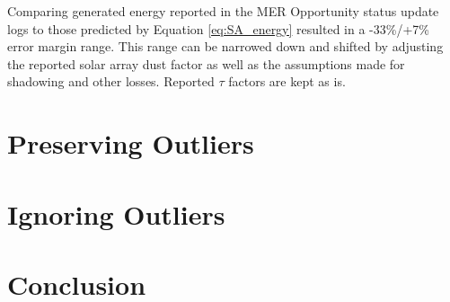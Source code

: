 Comparing generated energy reported in the MER Opportunity status update logs to those predicted by Equation \ref{eq:SA_energy} resulted in a -33\%/+7\% error margin range. This range can be narrowed down and shifted by adjusting the reported solar array dust factor as well as the assumptions made for shadowing and other losses.  Reported $\tau$ factors are kept as is.

\section{Preserving Outliers}
\label{sec:Appendix:NarrowedEnergyPredictionErrorMarginRange:PreservingOutliers}

\clearpage

\section{Ignoring Outliers}
\label{sec:Appendix:NarrowedEnergyPredictionErrorMarginRange:IgnoringOutliers}

\clearpage

\section{Conclusion}
\label{sec:Appendix:NarrowedEnergyPredictionErrorMarginRange:Conclusion}

\clearpage
